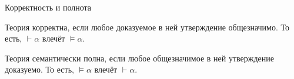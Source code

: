 \documentclass[aspectratio=169]{beamer}
\begin{document}
\begin{frame}{Корректность и полнота}
\begin{defrus}
Теория корректна, если любое доказуемое в ней утверждение общезначимо.
То есть, $\vdash\alpha$ влечёт $\models\alpha$.
\end{defrus}

\begin{defrus}
Теория семантически полна, если любое общезначимое в ней утверждение доказуемо.
То есть, $\models\alpha$ влечёт $\vdash\alpha$.
\end{defrus}
\end{frame}

\begin{comment}
\begin{frame}{Корректность исчисления высказываний}
\begin{thmrus}[корректность]
Если $\vdash\alpha$, то $\models\alpha$
\end{thmrus}

\begin{proof}
Индукция по длине вывода $n$.
\begin{itemize}
\item База, $n=1$ --- частный случай перехода (без правила Modus Ponens)
\item Переход. Пусть для любого доказательства длины $n$ формула $\delta_n$ общезначима.
Тогда рассмотрим обоснование $\delta_{n+1}$ и разберём случаи:
\begin{enumerate}
\item Аксиома --- убедиться, что все аксиомы общезначимы.
\item Modus Ponens $j$, $k$ --- убедиться, что если $\models\delta_j$ и 
$\models\delta_j\rightarrow\delta_{n+1}$, то $\models\delta_{n+1}$.
\end{enumerate}
\end{itemize}
\end{proof}
\end{frame}

\begin{frame}{Общезначимость схемы аксиом №9}
Общезначимость схемы аксиом --- истинность каждой аксиомы, задаваемой данной схемой, при любой оценке:
$$\llbracket(\alpha\rightarrow\beta)\rightarrow(\alpha\rightarrow\neg\beta)\rightarrow\neg\alpha\rrbracket
   = \textnormal{И}$$

Построим таблицу истинности формулы в зависимости от оценки $\alpha$ и $\beta$:
\vspace{0.3cm}


\end{comment}
\end{document}
